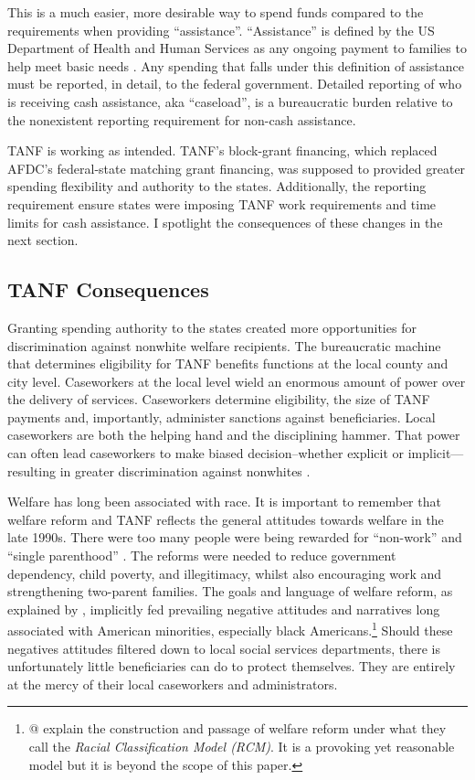 \documentclass[12pt,letterpaperpaper,]{book}
\begin{document}
This is a much easier, more desirable way to spend funds compared to the
requirements when providing ``assistance''. ``Assistance'' is defined by
the US Department of Health and Human Services as any ongoing payment to
families to help meet basic needs \citep{falk_temporary_2016}. Any
spending that falls under this definition of assistance must be
reported, in detail, to the federal government. Detailed reporting of
who is receiving cash assistance, aka ``caseload'', is a bureaucratic
burden relative to the nonexistent reporting requirement for non-cash
assistance.

TANF is working as intended. TANF's block-grant financing, which
replaced AFDC's federal-state matching grant financing, was supposed to
provided greater spending flexibility and authority to the states.
Additionally, the reporting requirement ensure states were imposing TANF
work requirements and time limits for cash assistance. I spotlight the
consequences of these changes in the next section.

\subsection{TANF Consequences}\label{tanf-consequences}

Granting spending authority to the states created more opportunities for
discrimination against nonwhite welfare recipients. The bureaucratic
machine that determines eligibility for TANF benefits functions at the
local county and city level. Caseworkers at the local level wield an
enormous amount of power over the delivery of services. Caseworkers
determine eligibility, the size of TANF payments and, importantly,
administer sanctions against beneficiaries. Local caseworkers are both
the helping hand and the disciplining hammer. That power can often lead
caseworkers to make biased decision--whether explicit or
implicit---resulting in greater discrimination against nonwhites
\citep{schram_deciding_2009}.

Welfare has long been associated with race. It is important to remember
that welfare reform and TANF reflects the general attitudes towards
welfare in the late 1990s. There were too many people were being
rewarded for ``non-work'' and ``single parenthood''
\citep{rector_continuing_2003}. The reforms were needed to reduce
government dependency, child poverty, and illegitimacy, whilst also
encouraging work and strengthening two-parent families. The goals and
language of welfare reform, as explained by
\citet{soss_disciplining_2011}, implicitly fed prevailing negative
attitudes and narratives long associated with American minorities,
especially black Americans.\footnote{@\citet{soss_color_2008} explain
  the construction and passage of welfare reform under what they call
  the \emph{Racial Classification Model (RCM)}. It is a provoking yet
  reasonable model but it is beyond the scope of this paper.} Should
these negatives attitudes filtered down to local social services
departments, there is unfortunately little beneficiaries can do to
protect themselves. They are entirely at the mercy of their local
caseworkers and administrators.
\end{document}
